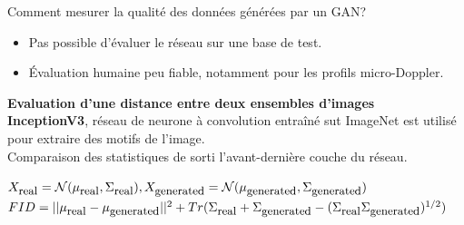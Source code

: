 \documentclass[a0,portrait]{a0poster}
\newcommand{\equtext}[1]{\mbox{\small{#1}}}
\begin{document}
\begin{multicols}{2}
\begin{tcolorbox}[colback=blue!5!lime,colframe=green!75!black,title={\section*{Mesurer les performances d'un GAN?}}]
Comment mesurer la qualité des données générées par un GAN?
\begin{itemize}
    \item Pas possible d'évaluer le réseau sur une base de test.
    \item Évaluation humaine peu fiable, notamment pour les profils micro-Doppler.
\end{itemize}
\end{tcolorbox}
\bigskip


\begin{tcolorbox}[colback=blue!5!white,colframe=blue!75!black,title={\section*{FID (Fréchet Inception Distance)}}]
\textbf{Evaluation d'une distance entre deux ensembles d'images}\\
\textbf{InceptionV3}, réseau de neurone à convolution entraîné sut ImageNet est utilisé pour extraire des motifs de l'image.\\
Comparaison des statistiques de sorti l'avant-dernière couche du réseau.
\begin{center}
$X_{\equtext{real}}=\mathcal{N}(\mu_{\equtext{real}}, \Sigma_{\equtext{real}}), X_{\equtext{generated}}=\mathcal{N}(\mu_{\equtext{generated}}, \Sigma_{\equtext{generated}})$
$FID = ||\mu_{\equtext{real}} - \mu_{\equtext{generated}}||^2 + Tr(\Sigma_{\equtext{real}} + \Sigma_{\equtext{generated}}  - (\Sigma_{\equtext{real}} \Sigma_{\equtext{generated}})^{1/2})$
\end{center}
\end{tcolorbox}
\bigskip



\end{multicols}
\end{document}
